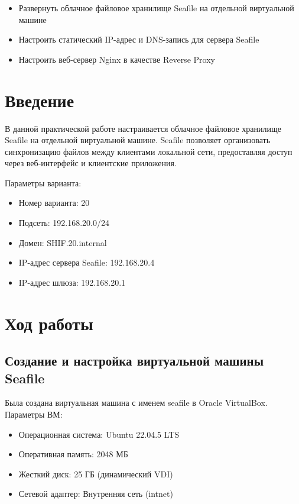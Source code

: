 \documentclass[a4paper,14pt,oneside,openany]{memoir}
\begin{document}
\begin{itemize}
    \item Развернуть облачное файловое хранилище Seafile на отдельной виртуальной машине
    \item Настроить статический IP-адрес и DNS-запись для сервера Seafile
    \item Настроить веб-сервер Nginx в качестве Reverse Proxy
\end{itemize}

\section{Введение}

В данной практической работе настраивается облачное файловое хранилище Seafile на отдельной виртуальной машине. Seafile позволяет организовать синхронизацию файлов между клиентами локальной сети, предоставляя доступ через веб-интерфейс и клиентские приложения.

Параметры варианта:
\begin{itemize}
    \item Номер варианта: 20
    \item Подсеть: 192.168.20.0/24
    \item Домен: SHIF.20.internal
    \item IP-адрес сервера Seafile: 192.168.20.4
    \item IP-адрес шлюза: 192.168.20.1
\end{itemize}

\section{Ход работы}

\subsection{Создание и настройка виртуальной машины Seafile}

Была создана виртуальная машина с именем seafile в Oracle VirtualBox. Параметры ВМ:
\begin{itemize}
    \item Операционная система: Ubuntu 22.04.5 LTS
    \item Оперативная память: 2048 МБ
    \item Жесткий диск: 25 ГБ (динамический VDI)
    \item Сетевой адаптер: Внутренняя сеть (intnet)
\end{itemize}
\end{document}
